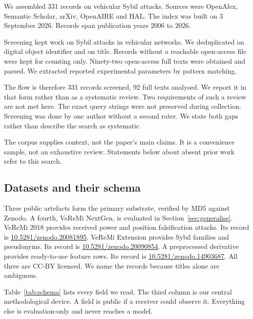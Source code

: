 \documentclass[conference]{IEEEtran}
\begin{document}
We assembled 331 records on vehicular Sybil attacks.
Sources were OpenAlex, Semantic Scholar, arXiv, OpenAIRE and HAL.
The index was built on 3 September 2026.
Records span publication years 2006 to 2026.

Screening kept work on Sybil attacks in vehicular networks.
We deduplicated on digital object identifier and on title.
Records without a reachable open-access file were kept for counting only.
Ninety-two open-access full texts were obtained and parsed.
We extracted reported experimental parameters by pattern matching.

The flow is therefore 331 records screened, 92 full texts analysed.
We report it in that form rather than as a systematic review.
Two requirements of such a review are not met here.
The exact query strings were not preserved during collection.
Screening was done by one author without a second rater.
We state both gaps rather than describe the search as systematic.

The corpus supplies context, not the paper's main claims.
It is a convenience sample, not an exhaustive review.
Statements below about absent prior work refer to this search.

\subsection{Datasets and their schema}

Three public artefacts form the primary substrate, verified by MD5 against Zenodo.
A fourth, VeReMi NextGen, is evaluated in Section~\ref{sec:generalise}.
VeReMi 2018 provides received power and position falsification attacks.
Its record is \url{10.5281/zenodo.20081895}.
VeReMi Extension provides Sybil families and pseudonyms.
Its record is \url{10.5281/zenodo.20090854}.
A preprocessed derivative provides ready-to-use feature rows.
Its record is \url{10.5281/zenodo.14903687}.
All three are CC-BY licensed.
We name the records because titles alone are ambiguous.

Table~\ref{tab:schema} lists every field we read.
The third column is our central methodological device.
A field is public if a receiver could observe it.
Everything else is evaluation-only and never reaches a model.
\end{document}
